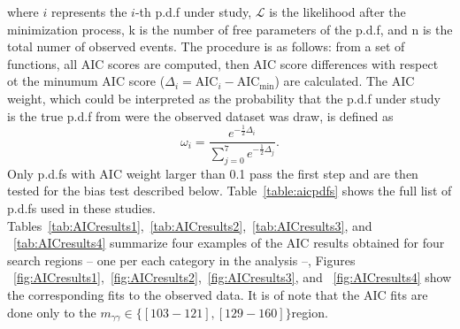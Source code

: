 where $i$ represents the $i$-th p.d.f under study, $\mathcal{L}$ is the likelihood after the minimization process,
k is the number of free parameters of the p.d.f, and n is the total
numer of observed events. The procedure is as follows: from a set of
functions, all AIC scores are computed, then AIC score differences
with respect ot the minumum AIC score
($\Delta_{i} = \mathrm{AIC}_{i} -\mathrm{AIC_{min}}$) are calculated.
The AIC weight, which could be interpreted as the probability that the
p.d.f under study is the true p.d.f from were the observed
dataset was draw, is defined as
\begin{equation}
\label{eq:AICweight}
\omega_{i} = \frac{e^{-\frac{1}{2}\Delta_{i}}}{\sum\limits_{j=0}^{7}e^{-\frac{1}{2}\Delta_{j}}}.
\end{equation}
Only p.d.fs with AIC weight larger than 0.1 pass the first step and
are then tested for the bias test described
below. Table~\ref{table:aicpdfs} shows the full list of p.d.fs used in
these studies. Tables~\ref{tab:AICresults1},~\ref{tab:AICresults2},~\ref{tab:AICresults3},  and
~\ref{tab:AICresults4} summarize four examples of the AIC results
obtained for four search regions -- one per each
category in the analysis --, Figures ~\ref{fig:AICresults1},~\ref{fig:AICresults2},~\ref{fig:AICresults3}, and
~\ref{fig:AICresults4} show the corresponding fits to the observed
data. It is of note that the AIC fits are done only to the
$m_{\gamma\gamma}\in \{[103-121],[129-160]\}$\GeV region.
